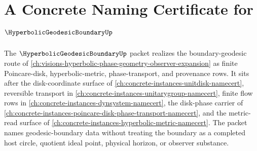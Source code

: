 \chapter{A Concrete Naming Certificate for $\HyperbolicGeodesicBoundaryUp$}
\label{ch:concrete-instances-hyperbolic-geodesic-boundary-namecert}

The $\HyperbolicGeodesicBoundaryUp$ packet realizes the boundary-geodesic route of \autoref{ch:visions-hyperbolic-phase-geometry-observer-expansion} as finite Poincare-disk, hyperbolic-metric, phase-transport, and provenance rows. It sits after the disk-coordinate surface of \autoref{ch:concrete-instances-unitdisk-namecert}, reversible transport in \autoref{ch:concrete-instances-unitarygroup-namecert}, finite flow rows in \autoref{ch:concrete-instances-dynsystem-namecert}, the disk-phase carrier of \autoref{ch:concrete-instances-poincare-disk-phase-transport-namecert}, and the metric-read surface of \autoref{ch:concrete-instances-hyperbolic-metric-namecert}. The packet names geodesic-boundary data without treating the boundary as a completed host circle, quotient ideal point, physical horizon, or observer substance.

